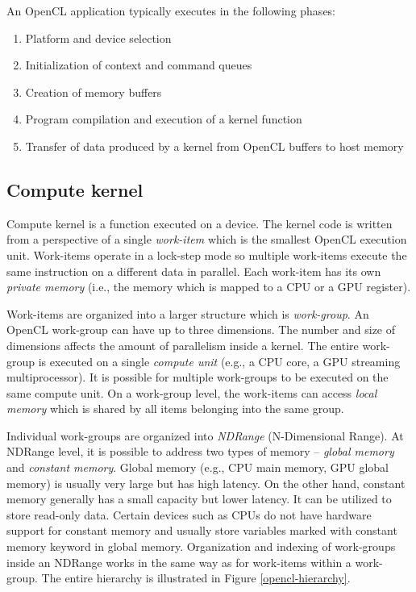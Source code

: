 \documentclass[
  digital,     %
  oneside,     %
  nosansbold,  %
  nocolorbold, %
  lof,         %
  lot,         %
]{fithesis4}
\begin{document}
An OpenCL application typically executes in the following phases:
\begin{enumerate}
    \item Platform and device selection
    \item Initialization of context and command queues
    \item Creation of memory buffers
    \item Program compilation and execution of a kernel function
    \item Transfer of data produced by a kernel from OpenCL buffers to host memory
\end{enumerate}

\subsection{Compute kernel}
Compute kernel is a function executed on a device. The kernel code is written from a perspective of a single \textit{work-item} which is the smallest OpenCL execution unit. Work-items operate in a lock-step mode so multiple work-items execute the same instruction on a different data in parallel. Each work-item has its own \textit{private memory} (i.e., the memory which is mapped to a CPU or a GPU register).

Work-items are organized into a larger structure which is \textit{work-group}. An OpenCL work-group can have up to three dimensions. The number and size of dimensions affects the amount of parallelism inside a kernel. The entire work-group is executed on a single \textit{compute unit} (e.g., a CPU core, a GPU streaming multiprocessor). It is possible for multiple work-groups to be executed on the same compute unit. On a work-group level, the work-items can access \textit{local memory} which is shared by all items belonging into the same group.

Individual work-groups are organized into \textit{NDRange} (N-Dimensional Range). At NDRange level, it is possible to address two types of memory -- \textit{global memory} and \textit{constant memory}. Global memory (e.g., CPU main memory, GPU global memory) is usually very large but has high latency. On the other hand, constant memory generally has a small capacity but lower latency. It can be utilized to store read-only data. Certain devices such as CPUs do not have hardware support for constant memory and usually store variables marked with constant memory keyword in global memory. Organization and indexing of work-groups inside an NDRange works in the same way as for work-items within a work-group. The entire hierarchy is illustrated in Figure \ref{opencl-hierarchy}.
\end{document}
